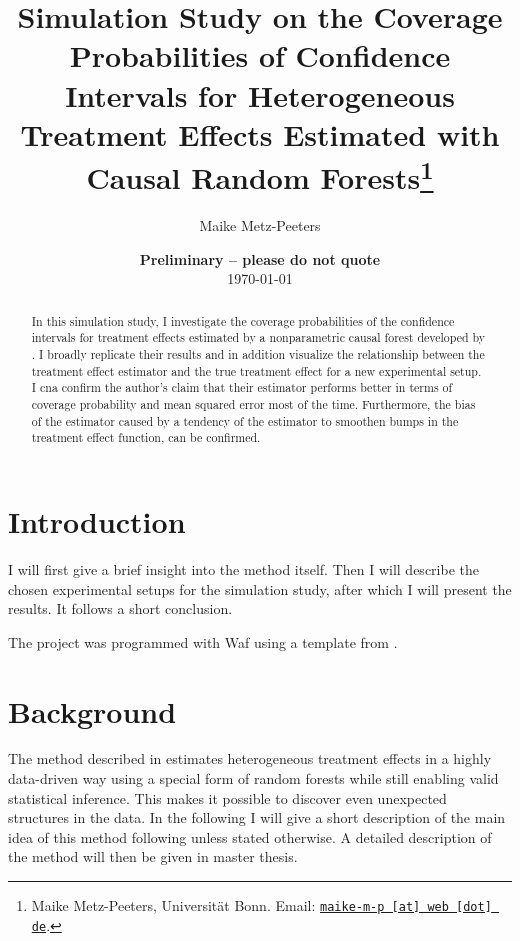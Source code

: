 \documentclass[11pt, a4paper, leqno]{article}
\begin{document}
\title{Simulation Study on the Coverage Probabilities of Confidence Intervals for Heterogeneous Treatment Effects Estimated with Causal Random Forests\thanks{Maike Metz-Peeters, Universität Bonn. Email: \href{mailto:maike-m-p@web.de}{\nolinkurl{maike-m-p [at] web [dot] de}}.}}

\author{Maike Metz-Peeters}

\date{
{\bf Preliminary -- please do not quote} 
\\[1ex] 
\today
}

\maketitle


\begin{abstract}
	In this simulation study, I investigate the coverage probabilities of the confidence intervals for treatment effects estimated by a nonparametric causal forest developed by \citet{wa18}. I broadly replicate their results and in addition visualize the relationship between the treatment effect estimator and the true treatment effect for a new experimental setup. I cna confirm the author's claim that their estimator performs better in terms of coverage probability and mean squared error most of the time. Furthermore, the bias of the estimator caused by a tendency of the estimator to smoothen bumps in the treatment effect function, can be confirmed.
    
\end{abstract}
\clearpage

\section{Introduction} %
\label{sec:introduction}

I will first give a brief insight into the method itself. Then I will describe the chosen experimental setups for the simulation study, after which I will present the results. It follows a short conclusion.


The project was programmed with Waf using a template from \citet{GaudeckerEconProjectTemplates}. 


\section{Background} %
\label{sec:background}
The method described in \citet{wa18} estimates heterogeneous treatment effects in a highly data-driven way using a special form of random forests while still enabling valid statistical inference. This makes it possible to discover even unexpected structures in the data. In the following I will give a short description of the main idea of this method following \citet{wa18} unless stated otherwise. A detailed description of the method will then be given in master thesis. 
\end{document}
